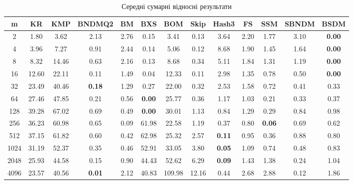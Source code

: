 \documentclass[a4paper,14pt]{extarticle} %
\begin{document}
				\begin{table}[h]
					\centering
					\scriptsize
					\begin{tabular}{|c|c|c|c|c|c|c|c|c|c|c|c|c|}
					\hline
					\textbf{m} & \textbf{KR} & \textbf{KMP} & \textbf{BNDMQ2} & \textbf{BM} & \textbf{BXS} & \textbf{BOM} & \textbf{Skip} & \textbf{Hash3} & \textbf{FS} & \textbf{SSM} & \textbf{SBNDM} & \textbf{BSDM} \\
					\hline
					2 & 1.80 & 3.62 & 2.13 & 2.76 & 0.15 & 3.41 & 0.13 & 3.64 & 2.20 & 1.77 & 3.10 & \textbf{0.00} \\
					\hline
					4 & 3.96 & 7.27 & 0.91 & 2.44 & 0.14 & 5.06 & 0.12 & 8.68 & 1.90 & 1.45 & 1.64 & \textbf{0.00} \\
					\hline
					8 & 8.32 & 14.46 & 0.63 & 2.16 & 0.13 & 8.68 & 0.34 & 5.11 & 1.84 & 1.31 & 1.19 & \textbf{0.00} \\
					\hline
					16 & 12.60 & 22.11 & 0.11 & 1.49 & 0.04 & 12.33 & 0.11 & 2.98 & 1.35 & 0.78 & 0.50 & \textbf{0.00} \\
					\hline
					32 & 23.49 & 40.46 & \textbf{0.18} & 1.29 & 0.27 & 22.00 & 0.32 & 2.53 & 1.58 & 0.72 & 0.41 & 0.33 \\
					\hline
					64 & 27.46 & 47.85 & 0.21 & 0.56 & \textbf{0.00} & 25.77 & 0.36 & 1.17 & 1.03 & 0.21 & 0.33 & 0.37 \\
					\hline
					128 & 39.28 & 67.02 & 0.69 & 0.49 & \textbf{0.00} & 30.01 & 1.13 & 0.84 & 1.29 & 0.29 & 0.84 & 0.98 \\
					\hline
					256 & 36.23 & 60.98 & 0.65 & 0.09 & 61.98 & 22.58 & 1.19 & 0.37 & 0.80 & \textbf{0.06} & 0.69 & 0.62 \\
					\hline
					512 & 37.15 & 61.82 & 0.60 & 0.42 & 62.98 & 25.32 & 2.57 & \textbf{0.11} & 0.95 & 0.36 & 0.88 & 0.80 \\
					\hline
					1024 & 31.19 & 52.37 & 0.35 & 0.46 & 52.91 & 33.05 & 3.80 & \textbf{0.05} & 1.09 & 0.74 & 0.48 & 0.83 \\
					\hline
					2048 & 25.93 & 44.58 & 0.15 & 0.90 & 44.43 & 52.62 & 6.29 & \textbf{0.09} & 1.43 & 1.38 & 0.24 & 1.04 \\
					\hline
					4096 & 23.57 & 40.56 & \textbf{0.01} & 2.12 & 40.83 & 109.98 & 12.16 & 0.44 & 2.68 & 2.88 & 0.12 & 1.86 \\
					\hline
					\end{tabular}
					\caption{Середні сумарні відносні результати }
					\label{table:relative_fullrandom}
					\end{table}
\end{document}

